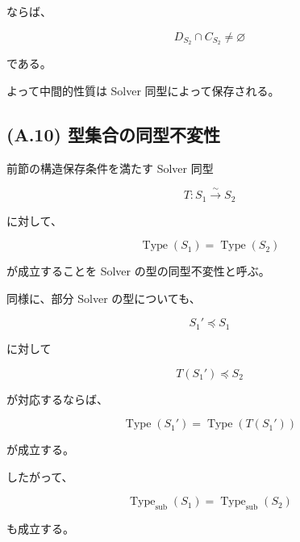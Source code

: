 \documentclass[a4paper,11pt]{article}
\newcommand{\SubSolver}{\preceq}
\newcommand{\Type}{\operatorname{Type}}
\begin{document}
ならば、

\begin{equation}
    D_{S_2}\cap C_{S_2}
    \neq
    \varnothing
\end{equation}

である。

よって中間的性質は Solver 同型によって保存される。


\subsection{(A.10) 型集合の同型不変性}
\label{subsec:A10}

前節の構造保存条件を満たす Solver 同型

\begin{equation}
    T:
    S_1
    \overset{\sim}{\longrightarrow}
    S_2
\end{equation}

に対して、

\begin{equation}
    \boxed{
        \Type(S_1)=\Type(S_2)
    }
    \label{eq:A-type-invariance}
\end{equation}

が成立することを Solver の型の同型不変性と呼ぶ。

同様に、部分 Solver の型についても、

\begin{equation}
    S_1'\SubSolver S_1
\end{equation}

に対して

\begin{equation}
    T(S_1')\SubSolver S_2
\end{equation}

が対応するならば、

\begin{equation}
    \Type(S_1')
    =
    \Type(T(S_1'))
\end{equation}

が成立する。

したがって、

\begin{equation}
    \Type_{\mathrm{sub}}(S_1)
    =
    \Type_{\mathrm{sub}}(S_2)
    \label{eq:A-subtype-invariance}
\end{equation}

も成立する。


\end{document}
